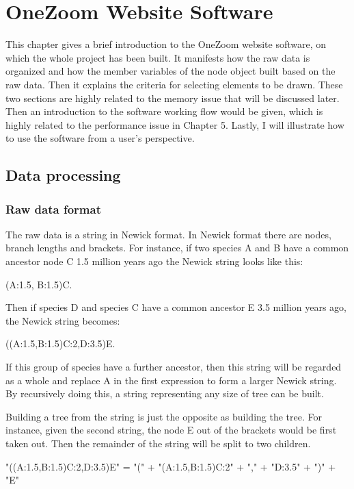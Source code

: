 \documentclass[MSc]{icldt}
\begin{document}
\chapter{OneZoom Website Software}

This chapter gives a brief introduction to the OneZoom website software, on which the whole project has been built. It manifests how the raw data is organized and how the member variables of the node object built based on the raw data. Then it explains the criteria for selecting elements to be drawn. These two sections are highly related to the memory issue that will be discussed later. Then an introduction to the software working flow would be given, which is highly related to the performance issue in Chapter 5. Lastly, I will illustrate how to use the software from a user's perspective.

\section{Data processing}

\subsection{Raw data format}

The raw data is a string in Newick format. In Newick format there are nodes, branch lengths and brackets. For instance, if two species A and B have a common ancestor node C 1.5 million years ago the Newick string looks like this: 
\begin{center}
	(A:1.5, B:1.5)C. 
\end{center}

Then if species D and species C have a common ancestor E 3.5 million years ago, the Newick string becomes: 
\begin{center}
	((A:1.5,B:1.5)C:2,D:3.5)E. 
\end{center}
If this group of species have a further ancestor, then this string will be regarded as a whole and replace A in the first expression to form a larger Newick string. By recursively doing this, a string representing any size of tree can be built.

Building a tree from the string is just the opposite as building the tree. For instance, given the second string, the node E out of the brackets would be first taken out. Then the remainder of the string will be split to two children.

\begin{center}
	"((A:1.5,B:1.5)C:2,D:3.5)E" =  "(" + "(A:1.5,B:1.5)C:2" + "," + "D:3.5" + ")" + "E"
\end{center}
\end{document}
